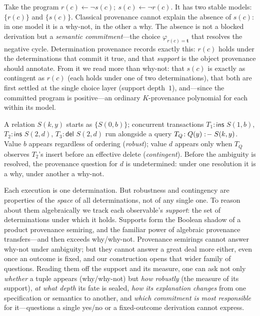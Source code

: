 \ifleaddatalog
\begin{example}
  \label{ex:intro}
  Take the program $r(c) \leftarrow \neg s(c);\ s(c) \leftarrow \neg r(c)$.
  It has two stable models: $\{r(c)\}$ and $\{s(c)\}$. Classical provenance
  cannot explain the absence of $s(c)$: in one model it is a why-not, in the
  other a why. The absence is not a blocked derivation but a \emph{semantic
  commitment}---the choice $\varphi_{r(c)=\mathbf{t}}$ that resolves the
  negative cycle. Determination provenance records exactly this: $r(c)$ holds
  under the determinations that commit it true, and that \emph{support} is the
  object provenance should annotate. From it we read more than why-not: that
  $s(c)$ is exactly as contingent as $r(c)$ (each holds under one of two
  determinations), that both are first settled at the single choice layer
  (support depth~$1$), and---since the committed program is positive---an
  ordinary $K$-provenance polynomial for each within its model.
\end{example}
\else
\begin{example}
  \label{ex:intro}
  A relation $S(k,y)$ starts as $\{S(0,b)\}$; concurrent transactions
  $T_1\!:\textsf{ins }S(1,b)$, $T_2\!:\textsf{ins }S(2,d)$,
  $T_3\!:\textsf{del }S(2,d)$ run alongside a query
  $T_Q\!: Q(y)\mathrel{:\!-} S(k,y)$. Value $b$ appears regardless of ordering
  (\emph{robust}); value $d$ appears only when $T_Q$ observes $T_2$'s insert
  before an effective delete (\emph{contingent}). Before the ambiguity is
  resolved, the provenance question for $d$ is undetermined: under one
  resolution it is a why, under another a why-not.
\end{example}
\fi

\noindent
Each execution is one determination. But robustness and contingency are
properties of the \emph{space} of all determinations, not of any single one.
To reason about them algebraically we track each observable's \emph{support}:
the set of determinations under which it holds. Supports form the Boolean
shadow of a product provenance semiring, and the familiar power of algebraic
provenance transfers---and then exceeds why/why-not. Provenance semirings
cannot answer why-not under ambiguity; but they cannot answer a great deal more
either, even once an outcome is fixed, and our construction opens that wider
family of questions. Reading them off the support and its measure, one can ask
not only \emph{whether} a tuple appears (why/why-not) but \emph{how robustly}
(the measure of its support), \emph{at what depth} its fate is sealed, \emph{how
its explanation changes} from one specification or semantics to another, and
\emph{which commitment is most responsible} for it---questions a single yes/no
or a fixed-outcome derivation cannot express.

